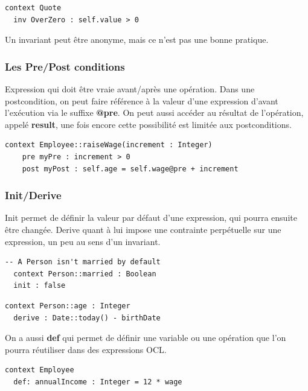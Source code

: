 \documentclass[../Syllabus.tex]{subfiles}
\begin{document}
\begin{lstlisting}[language=OCL]
  context Quote
  inv OverZero : self.value > 0
\end{lstlisting}

Un invariant peut être anonyme, mais ce n'est pas une bonne pratique.

\subsubsection{Les Pre/Post conditions}

Expression qui doit être vraie avant/après une opération. Dans une postcondition, on peut faire référence à la valeur d'une expression d'avant l'exécution via le suffixe \textbf{@pre}. On peut aussi accéder au résultat de l'opération, appelé \textbf{result}, une fois encore cette possibilité est limitée aux postconditions.

\begin{lstlisting}[language=OCL]
  context Employee::raiseWage(increment : Integer)
    pre myPre : increment > 0
    post myPost : self.age = self.wage@pre + increment
\end{lstlisting}

\subsubsection{Init/Derive}

Init permet de définir la valeur par défaut d'une expression, qui pourra ensuite être changée. Derive quant à lui impose une contrainte perpétuelle sur une expression, un peu au sens d'un invariant.

\begin{lstlisting}[language=OCL]
  -- A Person isn't married by default
  context Person::married : Boolean
  init : false
\end{lstlisting}

\begin{lstlisting}[language=OCL]
  context Person::age : Integer
  derive : Date::today() - birthDate
\end{lstlisting}

On a aussi \textbf{def} qui permet de définir une variable ou une opération que l'on pourra réutiliser dans des expressions OCL.

\begin{lstlisting}[language=OCL]
  context Employee
  def: annualIncome : Integer = 12 * wage
\end{lstlisting}
\end{document}
